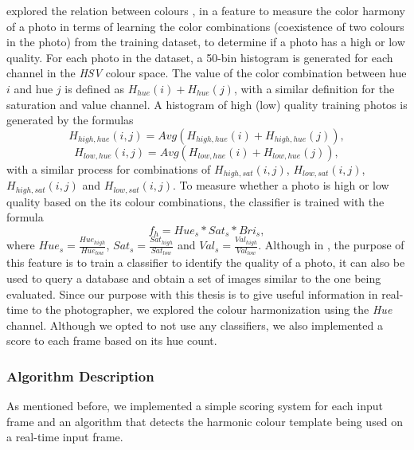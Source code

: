 \citeauthor{luo2008photo} explored the relation between colours \cite{luo2008photo}, in a feature to measure the color harmony of a photo in terms of learning the color combinations (coexistence of two colours in the photo) from the training dataset, to determine if a photo has a high or low quality.
For each photo in the dataset, a 50-bin histogram is generated for each channel in the \emph{HSV} colour space. The value of the color combination between hue $i$ and hue $j$ is defined as $H_{hue}(i) + H_{hue}(j)$, with a similar definition for the saturation and value channel. A histogram of high (low) quality training photos is generated by the formulas
\begin{equation}
H_{high,hue}(i,j) = Avg(H_{high,hue}(i)+H_{high,hue}(j)),
\end{equation}
\begin{equation}
H_{low,hue}(i,j) = Avg(H_{low,hue}(i)+H_{low,hue}(j)),
\end{equation}
with a similar process for combinations of $H_{high,sat}(i,j)$, $H_{low,sat}(i,j)$, $H_{high,sat}(i,j)$ and $H_{low,sat}(i,j)$.
To measure whether a photo is high or low quality based on the its colour combinations, the classifier is trained with the formula
\begin{equation}
f_{h} = Hue_{s}*Sat_{s}*Bri_{s},
\end{equation}
where $Hue_{s} = \frac{Hue_{high}}{Hue_{low}}$, $Sat_{s} = \frac{Sat_{high}}{Sat_{low}}$ and $Val_{s} = \frac{Val_{high}}{Val_{low}}$.
Although in \cite{luo2008photo}, the purpose of this feature is to train a classifier to identify the quality of a photo, it can also be used to query a database and obtain a set of images similar to the one being evaluated. Since our purpose with this thesis is to give useful information in real-time to the photographer, we explored the colour harmonization using the \emph{Hue} channel. Although we opted to not use any classifiers, we also implemented a score to each frame based on its hue count.

\subsubsection{Algorithm Description}
As mentioned before, we implemented a simple scoring system for each input frame and an algorithm that detects the harmonic colour template being used on a real-time input frame.

